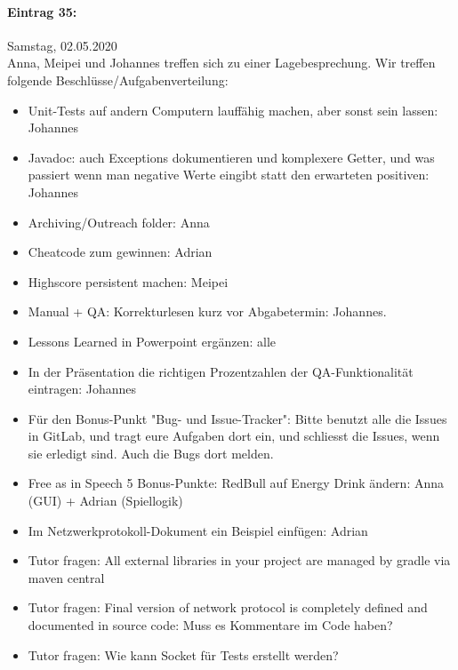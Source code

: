 \documentclass[12pt]{article}
\begin{document}
\paragraph{Eintrag 35:}
Samstag, 02.05.2020\\
Anna, Meipei und Johannes treffen sich zu einer Lagebesprechung. Wir treffen folgende Beschl\"usse/Aufgabenverteilung:
\begin{itemize}
\item Unit-Tests auf andern Computern lauff\"ahig machen, aber sonst sein lassen: Johannes
\item Javadoc: auch Exceptions dokumentieren und komplexere Getter, und was passiert wenn man negative Werte eingibt statt den erwarteten positiven: Johannes
\item Archiving/Outreach folder: Anna
\item Cheatcode zum gewinnen: Adrian
\item Highscore persistent machen: Meipei
\item Manual + QA: Korrekturlesen kurz vor Abgabetermin: Johannes.
\item Lessons Learned in Powerpoint erg\"anzen: alle
\item In der Pr\"asentation die richtigen Prozentzahlen der QA-Funktionalit\"at eintragen: Johannes
\item F\"ur den Bonus-Punkt "Bug- und Issue-Tracker": Bitte benutzt alle die Issues in GitLab, und tragt eure Aufgaben dort ein, und schliesst die Issues, wenn sie erledigt sind. Auch die Bugs dort melden.
\item Free as in Speech 5 Bonus-Punkte: RedBull auf Energy Drink \"andern: Anna (GUI) + Adrian (Spiellogik)
\item Im Netzwerkprotokoll-Dokument ein Beispiel einf\"ugen: Adrian
\item Tutor fragen: All external libraries in your project are managed by gradle via maven central
\item Tutor fragen: Final version of network protocol is completely defined and documented in source code: Muss es Kommentare im Code haben?
\item Tutor fragen: Wie kann Socket f\"ur Tests erstellt werden?
\end{itemize}
\end{document}
